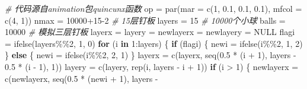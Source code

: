 \documentclass[]{tufte-book}
\newenvironment{Shaded}{}{}
\newcommand{\AttributeTok}[1]{\textcolor[rgb]{0.49,0.56,0.16}{#1}}
\newcommand{\CommentTok}[1]{\textcolor[rgb]{0.38,0.63,0.69}{\textit{#1}}}
\newcommand{\ConstantTok}[1]{\textcolor[rgb]{0.53,0.00,0.00}{#1}}
\newcommand{\ControlFlowTok}[1]{\textcolor[rgb]{0.00,0.44,0.13}{\textbf{#1}}}
\newcommand{\DecValTok}[1]{\textcolor[rgb]{0.25,0.63,0.44}{#1}}
\newcommand{\FloatTok}[1]{\textcolor[rgb]{0.25,0.63,0.44}{#1}}
\newcommand{\FunctionTok}[1]{\textcolor[rgb]{0.02,0.16,0.49}{#1}}
\newcommand{\NormalTok}[1]{#1}
\newcommand{\OtherTok}[1]{\textcolor[rgb]{0.00,0.44,0.13}{#1}}
\newcommand{\SpecialCharTok}[1]{\textcolor[rgb]{0.25,0.44,0.63}{#1}}
\begin{document}
\begin{Shaded}
\begin{Highlighting}[]
\CommentTok{\# 代码源自animation包quincunx函数}
\NormalTok{op }\OtherTok{=} \FunctionTok{par}\NormalTok{(}\AttributeTok{mar =} \FunctionTok{c}\NormalTok{(}\DecValTok{1}\NormalTok{, }\FloatTok{0.1}\NormalTok{, }\FloatTok{0.1}\NormalTok{, }\FloatTok{0.1}\NormalTok{), }\AttributeTok{mfcol =} \FunctionTok{c}\NormalTok{(}\DecValTok{4}\NormalTok{, }\DecValTok{1}\NormalTok{))}
\NormalTok{nmax }\OtherTok{=} \DecValTok{10000}\SpecialCharTok{+}\DecValTok{15{-}2}
\CommentTok{\# 15层钉板}
\NormalTok{layers }\OtherTok{=} \DecValTok{15}
\CommentTok{\# 10000个小球}
\NormalTok{balls }\OtherTok{=} \DecValTok{10000}
\CommentTok{\# 模拟三层钉板}
\NormalTok{layerx }\OtherTok{=}\NormalTok{ layery }\OtherTok{=}\NormalTok{ newlayerx }\OtherTok{=}\NormalTok{ newlayery }\OtherTok{=} \ConstantTok{NULL}
\NormalTok{flagi }\OtherTok{=} \FunctionTok{ifelse}\NormalTok{(layers}\SpecialCharTok{\%\%}\DecValTok{2}\NormalTok{, }\DecValTok{1}\NormalTok{, }\DecValTok{0}\NormalTok{)}
\ControlFlowTok{for}\NormalTok{ (i }\ControlFlowTok{in} \DecValTok{1}\SpecialCharTok{:}\NormalTok{layers) \{}
        \ControlFlowTok{if}\NormalTok{ (flagi) \{}
\NormalTok{                newi }\OtherTok{=} \FunctionTok{ifelse}\NormalTok{(i}\SpecialCharTok{\%\%}\DecValTok{2}\NormalTok{, }\DecValTok{1}\NormalTok{, }\DecValTok{2}\NormalTok{)}
\NormalTok{        \}}
        \ControlFlowTok{else}\NormalTok{ \{}
\NormalTok{                newi }\OtherTok{=} \FunctionTok{ifelse}\NormalTok{(i}\SpecialCharTok{\%\%}\DecValTok{2}\NormalTok{, }\DecValTok{2}\NormalTok{, }\DecValTok{1}\NormalTok{)}
\NormalTok{        \}}
\NormalTok{        layerx }\OtherTok{=} \FunctionTok{c}\NormalTok{(layerx, }\FunctionTok{seq}\NormalTok{(}\FloatTok{0.5} \SpecialCharTok{*}\NormalTok{ (i }\SpecialCharTok{+} \DecValTok{1}\NormalTok{), layers }\SpecialCharTok{{-}} \FloatTok{0.5} \SpecialCharTok{*} 
\NormalTok{                                       (i }\SpecialCharTok{{-}} \DecValTok{1}\NormalTok{), }\DecValTok{1}\NormalTok{))}
\NormalTok{        layery }\OtherTok{=} \FunctionTok{c}\NormalTok{(layery, }\FunctionTok{rep}\NormalTok{(i, layers }\SpecialCharTok{{-}}\NormalTok{ i }\SpecialCharTok{+} \DecValTok{1}\NormalTok{))}
        \ControlFlowTok{if}\NormalTok{ (i }\SpecialCharTok{\textgreater{}} \DecValTok{1}\NormalTok{) \{}
\NormalTok{                newlayerx }\OtherTok{=} \FunctionTok{c}\NormalTok{(newlayerx, }\FunctionTok{seq}\NormalTok{(}\FloatTok{0.5} \SpecialCharTok{*}\NormalTok{ (newi }\SpecialCharTok{+} \DecValTok{1}\NormalTok{), layers }\SpecialCharTok{{-}} 

\end{Highlighting}
\end{Shaded}
\end{document}
